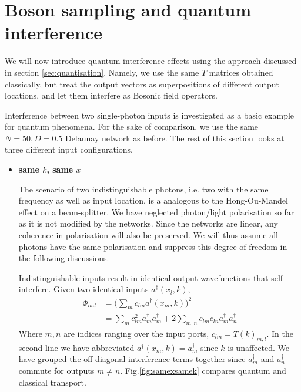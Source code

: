 \section{Boson sampling and quantum interference}
We will now introduce quantum interference effects using the approach discussed in section \ref{sec:quantisation}. Namely, we use the same $T$ matrices obtained classically, but treat the output vectors as superpositions of different output locations, and let them interfere as Bosonic field operators.

Interference between two single-photon inputs is investigated as a basic example for quantum phenomena. For the sake of comparison, we use the same $N=50, D=0.5$ Delaunay network as before. The rest of this section looks at three different input configurations.

\begin{itemize}
    \item \textbf{same $k$, same $x$}
    
    The scenario of two indistinguishable photons, i.e. two with the same frequency as well as input location, is a analogous to the Hong-Ou-Mandel effect on a beam-splitter. We have neglected photon/light polarisation so far as it is not modified by the networks. Since the networks are linear, any coherence in polarisation will also be preserved. We will thus assume all photons have the same polarisation and suppress this degree of freedom in the following discussions.
    
    Indistinguishable inputs result in identical output wavefunctions that self-interfere. Given two identical inputs $a^\dagger(x_l,k)$,
    \begin{align}
\label{eq:samexsamek}
        \Phi_{out} &= \bigg(\sum_m c_{lm}a^\dagger(x_m, k)\bigg)^2\\ \nonumber
          &= \sum_m c_{lm}^2 a^\dagger_m a^\dagger_m + 2\sum_{m,n} c_{lm}c_{ln} a^\dagger_m a^\dagger_n
\end{align}
    Where $m,n$ are indices ranging over the input ports, $c_{lm} = T(k)_{m,l}$. In the second line we have abbreviated $a^\dagger(x_m, k) = a^\dagger_m$ since $k$ is unaffected. We have grouped the off-diagonal interference terms together since $a^\dagger_m$ and $a^\dagger_n$ commute for outputs $m \neq n$. Fig.\ref{fig:samexsamek} compares quantum and classical transport.
    

\end{itemize}
